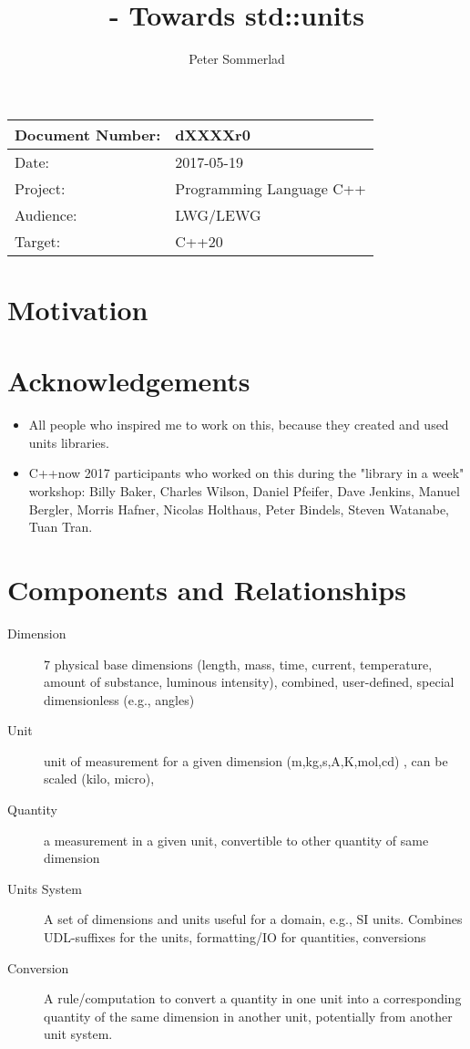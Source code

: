 \documentclass[ebook,11pt,article]{memoir}
\title{\papernumber{} - Towards std::units}
\author{Peter Sommerlad}
\date{\paperdate}                        %
\newcommand{\papernumber}{dXXXXr0}
\newcommand{\paperdate}{2017-05-19}
\begin{document}
\maketitle
\begin{tabular}[t]{|l|l|}\hline 
Document Number:& \papernumber  \\\hline
Date: & \paperdate \\\hline
Project: & Programming Language C++\\\hline 
Audience: & LWG/LEWG\\\hline
Target: & C++20\\\hline
\end{tabular}

\chapter{Motivation}

\chapter{Acknowledgements}
\begin{itemize}
\item All people who inspired me to work on this, because they created and used units libraries.
\item C++now 2017 participants who worked on this during the "library in a week" workshop: Billy Baker, Charles Wilson, Daniel Pfeifer, Dave Jenkins, Manuel Bergler, Morris Hafner, Nicolas Holthaus, Peter Bindels, Steven Watanabe, Tuan Tran.
\end{itemize}

\chapter{Components and Relationships}

\begin{description}
\item [Dimension] 7 physical base dimensions (length, mass, time, current, temperature, amount of substance, luminous intensity), combined, user-defined, special dimensionless (e.g., angles)
\item [Unit] unit of measurement for a given dimension (m,kg,s,A,K,mol,cd) , can be scaled (kilo, micro), 
\item [Quantity] a measurement in a given unit, convertible to other quantity of same dimension
\item [Units System] A set of dimensions and units useful for a domain, e.g., SI units. Combines UDL-suffixes for the units, formatting/IO for quantities, conversions
\item [Conversion] A rule/computation to convert a quantity in one unit into a corresponding quantity of the same dimension in another unit, potentially from another unit system.
\end{description}
\end{document}
